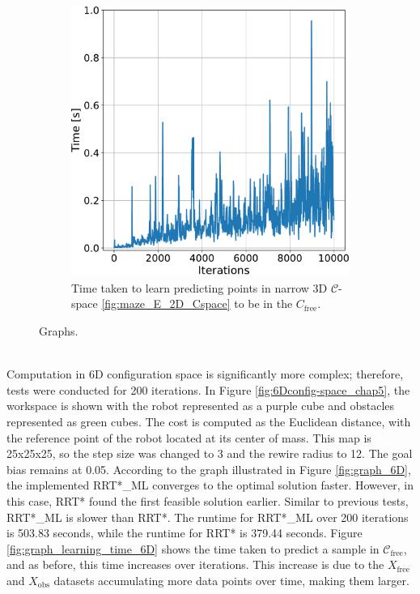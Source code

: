 \documentclass{ctuthesis}
\begin{document}
\begin{figure}[!ht]
\begin{subfigure}[t]{0.49\textwidth}
    \includegraphics[width=\textwidth]{figChap5/graph_E_2D_learning_time.pdf}   
    \caption{Time taken to learn predicting points in narrow 3D $\mathcal{C}$-space \ref{fig:maze_E_2D_Cspace}
    to be in the \(C_{\text{free}}\).}
    \label{fig:graph_learning_time_2D}
  \end{subfigure} 
  \caption{Graphs.}
  \label{fig:graphs_2D}
\end{figure}
\\
Computation in 6D configuration space is significantly more complex; 
therefore, tests were conducted for 200 iterations. 
In Figure \ref{fig:6Dconfig-space_chap5}, the workspace is shown with the robot represented as a purple cube and 
obstacles represented as green cubes. 
The cost is computed as the Euclidean distance, 
with the reference point of the robot located at its center of mass. 
This map is 25x25x25, so the step size was changed to 3 and the rewire radius to 12. 
The goal bias remains at 0.05. 
According to the graph illustrated in Figure \ref{fig:graph_6D}, 
the implemented RRT*\_ML converges to the optimal solution faster. 
However, in this case, RRT* found the first feasible solution earlier. 
Similar to previous tests, RRT*\_ML is slower than RRT*.
The runtime for RRT*\_ML over 200 iterations is 503.83 seconds,
while the runtime for RRT* is 379.44 seconds. 
Figure \ref{fig:graph_learning_time_6D} shows the time taken to predict a sample 
in \( \mathcal{C}_{\text{free}} \), and as before, 
this time increases over iterations. 
This increase is due to the \( X_{\text{free}} \) 
and \( X_{\text{obs}} \) datasets accumulating more data points over time, 
making them larger.
\end{document}
